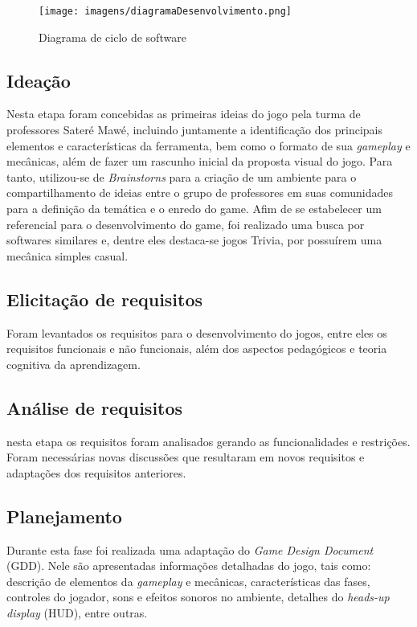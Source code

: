 \documentclass[12pt]{article}
\begin{document}
		\begin{figure}[!ht]
			\centering
			\texttt{[image: imagens/diagramaDesenvolvimento.png]}
			\caption{Diagrama de ciclo de software}
			\label{fig:diagram}
		\end{figure}
	
	\subsection{Ideação}
		Nesta etapa foram concebidas as primeiras ideias do jogo pela turma de professores Sateré Mawé, incluindo juntamente a identificação dos principais elementos e características da ferramenta, bem como o formato de sua \textit{gameplay} e mecânicas, além de fazer um rascunho inicial da proposta visual do jogo. Para tanto, utilizou-se de \textit{Brainstorns} para a criação de um ambiente para o compartilhamento de ideias entre o grupo de professores em suas comunidades para a definição da temática e o enredo do game. Afim de se estabelecer um referencial para o desenvolvimento do game, foi realizado uma busca por softwares similares e, dentre eles destaca-se jogos Trivia, por possuírem uma mecânica simples casual.     
	 
	\subsection{Elicitação de requisitos}
		Foram levantados os requisitos para o desenvolvimento do jogos, entre eles os requisitos funcionais e não funcionais, além dos aspectos pedagógicos e teoria cognitiva da aprendizagem.
	\subsection{Análise de requisitos}
		nesta etapa os requisitos foram analisados gerando as funcionalidades e restrições. Foram necessárias novas discussões que resultaram em novos requisitos e adaptações dos requisitos anteriores.
		
	\subsection{Planejamento}
		Durante esta fase foi realizada uma adaptação do \textit{Game Design Document} (GDD). Nele são apresentadas informações detalhadas do jogo, tais como: descrição de elementos da \textit{gameplay} e mecânicas, características das fases, controles do jogador, sons e efeitos sonoros no ambiente, detalhes do \textit{heads-up display} (HUD), entre outras.
	
\end{document}
